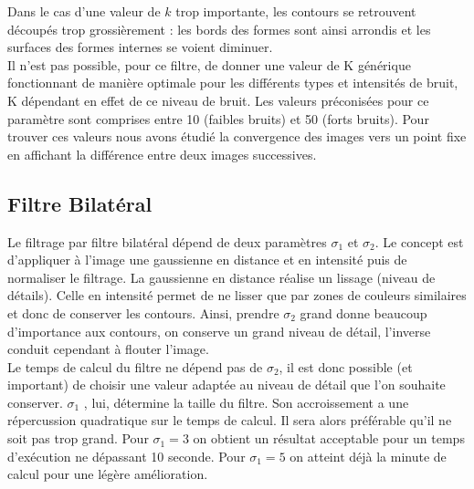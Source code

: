 \documentclass[a4,12pt]{article}
\begin{document}
Dans le cas d'une valeur de $k$ trop importante, les contours se retrouvent découpés trop grossièrement : les bords des formes sont ainsi arrondis et les surfaces des formes internes se voient diminuer.\\

Il n'est pas possible, pour ce filtre, de donner une valeur de K générique fonctionnant de manière optimale pour les différents types et intensités de bruit, K dépendant en effet de ce niveau de bruit. Les valeurs préconisées pour ce paramètre sont comprises entre  10 (faibles bruits) et 50 (forts bruits). Pour trouver ces valeurs nous avons étudié la convergence des images vers un point fixe en affichant la différence entre deux images successives.
\subsection{Filtre Bilatéral}

Le filtrage par filtre bilatéral dépend de deux paramètres $\sigma_1$ et $\sigma_2$. 
Le concept est d'appliquer à l'image une gaussienne en distance et en intensité puis de normaliser le filtrage.
La gaussienne en distance réalise un lissage (niveau de détails). 
Celle en intensité permet de ne lisser que par zones de couleurs similaires et donc de conserver les contours.
Ainsi, prendre $\sigma_2$ grand donne beaucoup d'importance aux contours, 
on conserve un grand niveau de détail, 
l'inverse conduit cependant à flouter l'image.\\

Le temps de calcul du filtre ne dépend pas de $\sigma_2$,
il est donc possible (et important) de choisir une valeur adaptée au niveau de détail que l'on souhaite conserver.
$\sigma_1$ , lui, détermine la taille du filtre. 
Son accroissement a une répercussion quadratique sur le temps de calcul.
Il sera alors préférable qu'il ne soit pas trop grand. 
Pour $\sigma_1 = 3 $ on obtient un résultat acceptable pour un temps d'exécution ne dépassant 10 seconde.
Pour $\sigma_1 = 5 $ on atteint déjà la minute de calcul pour une légère amélioration.\\
\end{document}
